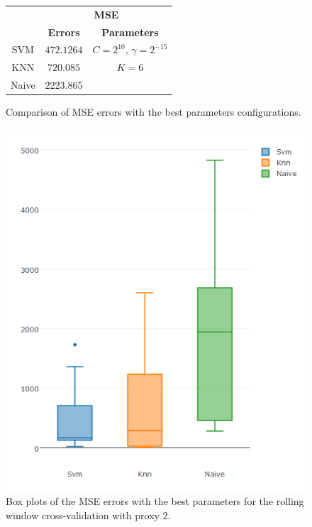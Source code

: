 \begin{figure}[!h]
\centering
\begin{tabular}{|c|c|c|}
   \hline
   & \multicolumn{2}{|c|}{\textbf{MSE}} \\ \cline{2-3}
   & \textbf{Errors} & \textbf{Parameters}          \\ \hline
   SVM  &  $472.1264$  & $C = 2^{10}$, $\gamma = 2^{-15}$          \\ 
   KNN & $720.085$  & $K = 6$ \\ 
   Naive & $2223.865$  &      \\ 
   \hline
   \end{tabular}
\caption{Comparison of MSE errors with the best parameters configurations.}
\label{fig:table10yMSEp2}
\centering
\includegraphics[width=0.95\linewidth, height = 0.67\textheight]{img/10yproxy2MSE.png}
\caption{Box plots of the MSE errors with the best parameters for the rolling window cross-validation with proxy 2.}
\end{figure}


